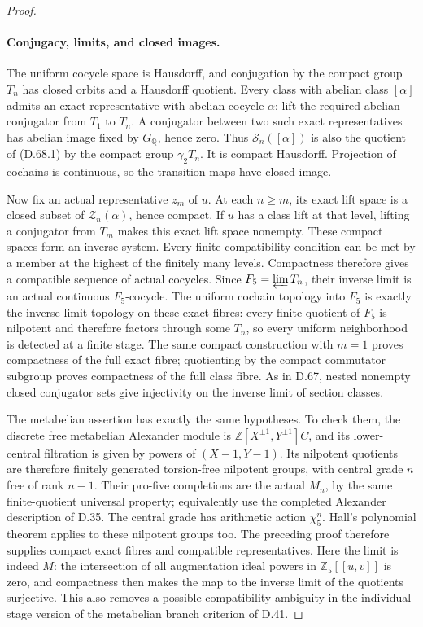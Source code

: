 \begin{proof}
\paragraph{Conjugacy, limits, and closed images.}
The uniform cocycle space is Hausdorff, and
conjugation by the compact group \(T_n\) has
closed orbits and a Hausdorff quotient. Every
class with abelian class \([\alpha]\) admits
an exact representative with abelian cocycle
\(\alpha\): lift the required abelian
conjugator from \(T_1\) to \(T_n\).
A conjugator between two such exact
representatives has abelian image fixed by
\(G_{\mathbb Q}\), hence zero. Thus
\(\mathscr S_n([\alpha])\) is also the
quotient of (D.68.1) by the compact group
\(\gamma_2T_n\). It is compact Hausdorff.
Projection of cochains is continuous, so the
transition maps have closed image.

Now fix an actual representative \(z_m\) of
\(u\). At each \(n\ge m\), its exact lift
space is a closed subset of
\(\mathscr Z_n(\alpha)\), hence compact.
If \(u\) has a class lift at that level,
lifting a conjugator from \(T_m\) makes
this exact lift space nonempty. These compact
spaces form an inverse system. Every finite
compatibility condition can be met by a
member at the highest of the finitely many
levels. Compactness therefore gives a
compatible sequence of actual cocycles.
Since \(F_5=\varprojlim T_n\), their inverse
limit is an actual continuous \(F_5\)-cocycle.
The uniform cochain topology into \(F_5\) is
exactly the inverse-limit topology on these
exact fibres: every finite quotient of \(F_5\)
is nilpotent and therefore factors through
some \(T_n\), so every uniform neighborhood
is detected at a finite stage.
The same compact construction with \(m=1\)
proves compactness of the full exact fibre;
quotienting by the compact commutator subgroup
proves compactness of the full class fibre.
As in D.67, nested nonempty closed conjugator
sets give injectivity on the inverse limit
of section classes.

The metabelian assertion has exactly the same
hypotheses. To check them, the discrete free
metabelian Alexander module is
\(\mathbb Z[X^{\pm1},Y^{\pm1}]C\), and
its lower-central filtration is given by
powers of \((X-1,Y-1)\). Its nilpotent
quotients are therefore finitely generated
torsion-free nilpotent groups, with central
grade \(n\) free of rank \(n-1\).
Their pro-five completions are the actual
\(M_n\), by the same finite-quotient universal
property; equivalently use the completed
Alexander description of D.35. The central
grade has arithmetic action \(\chi_5^n\).
Hall's polynomial theorem applies to these
nilpotent groups too. The preceding proof
therefore supplies compact exact fibres and
compatible representatives. Here the limit is
indeed \(M\): the intersection of all augmentation
ideal powers in \(\mathbb Z_5[[u,v]]\) is zero,
and compactness then makes the map to the
inverse limit of the quotients surjective.
This also removes a possible compatibility
ambiguity in the individual-stage version
of the metabelian branch criterion of D.41.


\end{proof}
